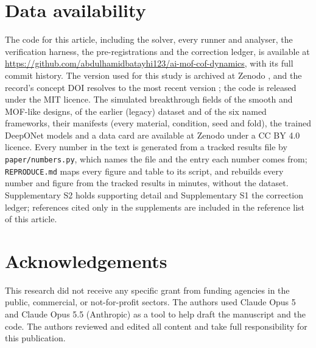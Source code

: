 \documentclass[10pt,a4paper]{article}
\begin{document}
\section*{Data availability}
The code for this article, including the solver, every runner and analyser, the
verification harness, the pre-registrations and the correction ledger, is available at
\url{https://github.com/abdulhamidbatayhi123/ai-mof-cof-dynamics}, with its full commit
history. The version used for this study is archived at Zenodo \cite{batayhi2026code}, and
the record's concept DOI resolves to the most recent version \cite{batayhi2026codeconcept};
the code is released under the MIT licence. The simulated breakthrough fields of the
smooth and MOF-like designs, of the earlier (legacy) dataset and of the six named frameworks, their manifests (every
material, condition, seed and fold), the trained DeepONet models and a data card are
available at Zenodo \cite{batayhi2026data} under a CC BY 4.0 licence. Every number in the text is
generated from a tracked results file by \texttt{paper/numbers.py}, which names the file
and the entry each number comes from; \texttt{REPRODUCE.md} maps every figure and table to
its script, and rebuilds every number and figure from the tracked results in minutes,
without the dataset. Supplementary S2 holds supporting detail and Supplementary S1 the
correction ledger; references cited only in the supplements are included in the reference
list of this article.

\section*{Acknowledgements}
This research did not receive any specific grant from funding agencies in the public,
commercial, or not-for-profit sectors. The authors used Claude Opus 5 and Claude Opus
5.5 (Anthropic) as a tool to help draft the manuscript and the code. The authors reviewed
and edited all content and take full responsibility for this publication.



\end{document}

